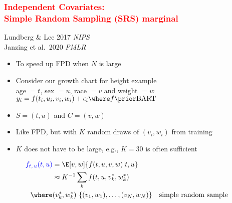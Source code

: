 \documentclass[11pt,dvipsnames,usenames,times]{beamer}
\newcommand*{\BART}{\mathrm{BART}\ }
\begin{document}
\begin{frame}\frametitle{\bf%
\textcolor{red}{Independent Covariates:\\ Simple Random Sampling (SRS) marginal}}
Lundberg \& Lee 2017 {\it NIPS} \\
Janzing et al.\ 2020 {\it PMLR} 
\begin{itemize}
\item To speed up FPD when $N$ is large
\item Consider our growth chart for height example\\
age $=t$, sex $=u$, race $=v$ and weight $=w$\\
$y_i = f(t_i, u_i, v_i, w_i) + \epsilon_i \where f \prior \BART$
\item $S=(t, u)$ and $C=(v, w)$
\item Like FPD, but with $K$ random draws of $(v_i, w_i)$ from training
\item $K$ does not have to be large, e.g., $K=30$ is often sufficient
\end{itemize}
\begin{align*}
\textcolor{blue}{f_{t,\,u}(t, u)}&=\E[v,w]{f(t, u, v, w)|t, u} \\ %
&\approx K^{-1} \sum_k f(t, u, v^*_k, {w}^*_k) \\ %
\where& (v^*_k, {w}^*_k) ~ \{(v_1, w_1), \dots, (v_N, w_N)\} & & \mbox{simple random sample} \\
\end{align*}

\end{frame}
\end{document}
